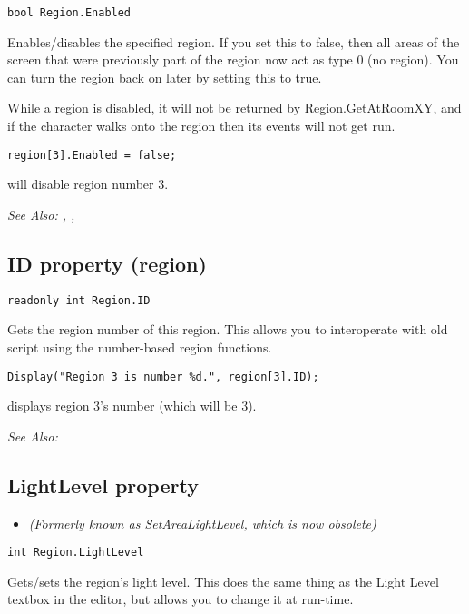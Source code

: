 \begin{verbatim}
bool Region.Enabled
\end{verbatim}
Enables/disables the specified region. If you set this to false, then all areas of the screen
that were previously part of the region now act as type 0 (no region). You can turn the region
back on later by setting this to true.

While a region is disabled, it will not be returned by Region.GetAtRoomXY, and if
the character walks onto the region then its events will not get run.

\begin{verbatim}
region[3].Enabled = false;
\end{verbatim}
will disable region number 3.

\it{See Also:} ,
,


\subsection{ID property (region)}\label{Region.ID}%

\begin{verbatim}
readonly int Region.ID
\end{verbatim}
Gets the region number of this region. This allows you to interoperate with old
script using the number-based region functions.

\begin{verbatim}
Display("Region 3 is number %d.", region[3].ID);
\end{verbatim}
displays region 3's number (which will be 3).

\it{See Also:} 


\subsection{LightLevel property}\label{Region.LightLevel}%

\begin{itemize}
\item \it{(Formerly known as SetAreaLightLevel, which is now obsolete)} 
\end{itemize}

\begin{verbatim}
int Region.LightLevel
\end{verbatim}
Gets/sets the region's light level. This does the same thing as the Light Level
textbox in the editor, but allows you to change it at run-time.

